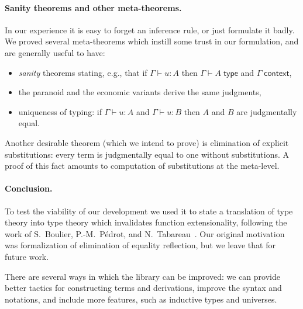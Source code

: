 \documentclass{easychair}
\newcommand{\ctx}{\Gamma}
\newcommand{\isctx}{\ctx\;\mathsf{context}}
\newcommand{\istype}[1]{\ctx \vdash #1 \;\mathsf{type}}
\newcommand{\isterm}[2]{\ctx \vdash #1 : #2}
\begin{document}
\paragraph*{Sanity theorems and other meta-theorems.}
\label{sec:sanity-theorems}

In our experience it is easy to forget an inference rule, or just formulate it badly. We
proved several meta-theorems which instill some trust in our formulation, and are
generally useful to have:
%
\begin{itemize}
\item \emph{sanity} theorems stating, e.g., that if $\isterm{u}{A}$ then $\istype{A}$ and $\isctx$,
\item the paranoid and the economic variants derive the same judgments,
\item uniqueness of typing: if $\isterm{u}{A}$ and $\isterm{u}{B}$ then $A$ and $B$ are
  judgmentally equal.
\end{itemize}
%
Another desirable theorem (which we intend to prove) is elimination of explicit
substitutions: every term is judgmentally equal to one without substitutions. A proof of
this fact amounts to computation of substitutions at the meta-level.



\paragraph*{Conclusion.}

To test the viability of our development we used it to state a translation of type theory
into type theory which invalidates function extensionality, following the work of
S.~Boulier, P.-M.~Pédrot, and N.~Tabareau~\cite{boulier17:_next_syntac_model_type_theor}.
Our original motivation was formalization of elimination of equality reflection, but we
leave that for future work.

There are several ways in which the library can be improved: we can provide better tactics
for constructing terms and derivations, improve the syntax and notations, and include more
features, such as inductive types and universes.





\end{document}
